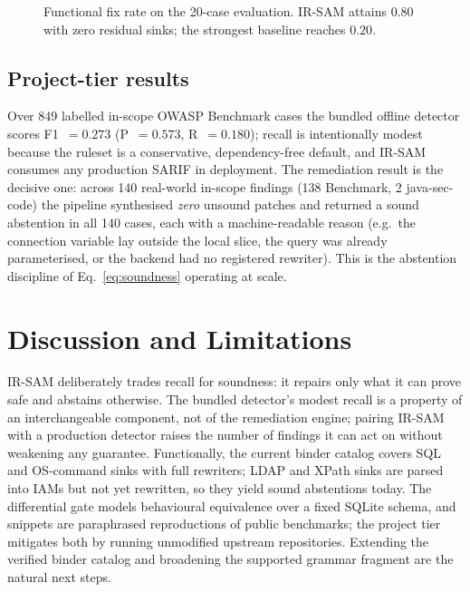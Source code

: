\documentclass[conference]{IEEEtran}
\newcommand{\irsam}{IR-SAM}
\begin{document}
\begin{figure}[t]
\centering
{}
\caption{Functional fix rate on the 20-case evaluation. \irsam{} attains
$0.80$ with zero residual sinks; the strongest baseline reaches $0.20$.}
\label{fig:m2}
\end{figure}

\subsection{Project-tier results}
Over 849 labelled in-scope OWASP Benchmark cases the bundled offline
detector scores F1~$=0.273$ (P~$=0.573$, R~$=0.180$); recall is
intentionally modest because the ruleset is a conservative,
dependency-free default, and \irsam{} consumes any production SARIF in
deployment. The remediation result is the decisive one: across 140
real-world in-scope findings (138 Benchmark, 2 java-sec-code) the pipeline
synthesised \emph{zero} unsound patches and returned a sound abstention in
all 140 cases, each with a machine-readable reason (e.g.\ the connection
variable lay outside the local slice, the query was already parameterised,
or the backend had no registered rewriter). This is the abstention
discipline of Eq.~\eqref{eq:soundness} operating at scale.

\section{Discussion and Limitations}
\irsam{} deliberately trades recall for soundness: it repairs only what it
can prove safe and abstains otherwise. The bundled detector's modest
recall is a property of an interchangeable component, not of the
remediation engine; pairing \irsam{} with a production detector raises the
number of findings it can act on without weakening any guarantee.
Functionally, the current binder catalog covers SQL and OS-command sinks
with full rewriters; LDAP and XPath sinks are parsed into IAMs but not yet
rewritten, so they yield sound abstentions today. The differential gate
models behavioural equivalence over a fixed SQLite schema, and snippets
are paraphrased reproductions of public benchmarks; the project tier
mitigates both by running unmodified upstream repositories. Extending the
verified binder catalog and broadening the supported grammar fragment are
the natural next steps.
\end{document}
